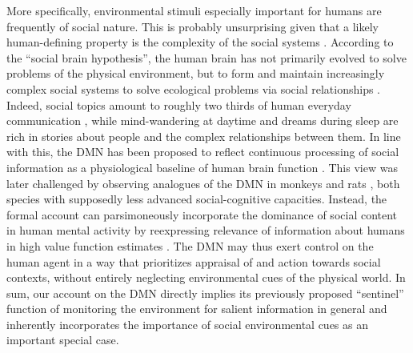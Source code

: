 \documentclass[10pt,letterpaper]{article}
\begin{document}
More specifically,
environmental stimuli especially important for humans are frequently of
social nature. This is probably unsurprising
given that a likely human-defining property is
the complexity of the social systems
\citep{tomasello2009cultural}.
According to the ``social brain hypothesis'',
the human brain has not primarily evolved to solve problems of the
physical environment, but to form and maintain increasingly complex
social systems to solve ecological problems via social relationships
\citep{whiten1988machiavellian}.
Indeed, social topics amount to roughly
two thirds of human everyday communication \citep{dunbar1997human},
while
mind-wandering at daytime and dreams during sleep
are rich in stories about people and
the complex relationships between them.
%
In line with this, the DMN has been proposed to reflect
continuous processing of social information as a
physiological baseline of human brain function
\citep{schilbach2008minds}. This view was later challenged by observing
analogues of the DMN in monkeys \citep{mantini2011default}
and rats \citep{lu2012rat}, both species with
supposedly less advanced social-cognitive capacities.
Instead,
the formal account can parsimoneously incorporate
the dominance of social content in
human mental activity by reexpressing relevance of information about humans
in high value function estimates
\citep{baker2009action, kampe2001psychology, krienen2010clan}.
The DMN may thus exert control on the human agent in a way that prioritizes
appraisal of and action towards social contexts,
without entirely neglecting environmental cues of the physical world.
In sum,
our account on the DMN directly implies
its previously proposed ``sentinel'' function
of monitoring the environment for salient information
in general and
inherently incorporates the importance of social environmental cues
as an important special case.
\end{document}
